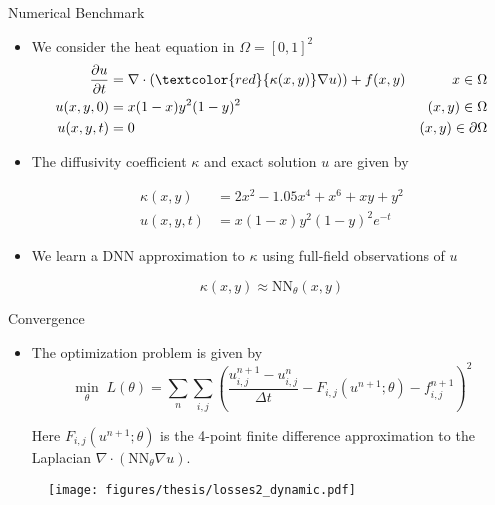 \documentclass[usenames,dvipsnames]{beamer}
\begin{document}
\begin{frame}{Numerical Benchmark}
\begin{itemize}
\item We consider the heat equation in $\Omega = [0,1]^2$
\begin{equation*}
	\begin{aligned}
		\frac{\partial u}{\partial t} &= \nabla \cdot (\textcolor{red}{\kappa(x, y)} \nabla u))+  f(x, y) & x\in \Omega\\ 
		u(x,y,0) &= x(1-x)y^2(1-y)^2 & (x,y)\in \Omega\\
		u(x,y,t) &= 0 & (x,y)\in  \partial \Omega
	\end{aligned}
\end{equation*}

\item The diffusivity coefficient $\kappa$ and exact solution $u$ are given by 

\begin{equation*}
\begin{aligned}
	\kappa(x,y) &= 2x^2 - 1.05x^4 + x^6 +xy+y^2\\ 
	u(x,y,t) &= x(1-x)y^2(1-y)^2 e^{-t}
\end{aligned}
\end{equation*}

\item We learn a DNN approximation to $\kappa$ using full-field observations of $u$

$$\kappa(x,y) \approx \text{NN}_\theta(x, y)$$
\end{itemize}
\end{frame}


\begin{frame}{Convergence}
	\begin{itemize}
		
		\item The optimization problem is given by 
		\begin{equation}
			\min_\theta\; L(\theta) = \sum_n\sum_{i,j} \left(\frac{u_{i,j}^{n+1} - u_{i,j}^n}{\Delta t} - F_{i,j}( u^{n+1}; \theta) -  f^{n+1}_{i,j}\right)^2 
		\end{equation}
		
		Here $F_{i,j}(u^{n+1}; \theta)$ is the 4-point finite difference approximation to the Laplacian $\nabla\cdot (\text{NN}_\theta \nabla u)$.
		
	
		\end{itemize}
	
		\begin{figure}[htbp]
		\centering
		\texttt{[image: figures/thesis/losses2\_dynamic.pdf]}
	\end{figure}
	
\end{frame}
\end{document}
